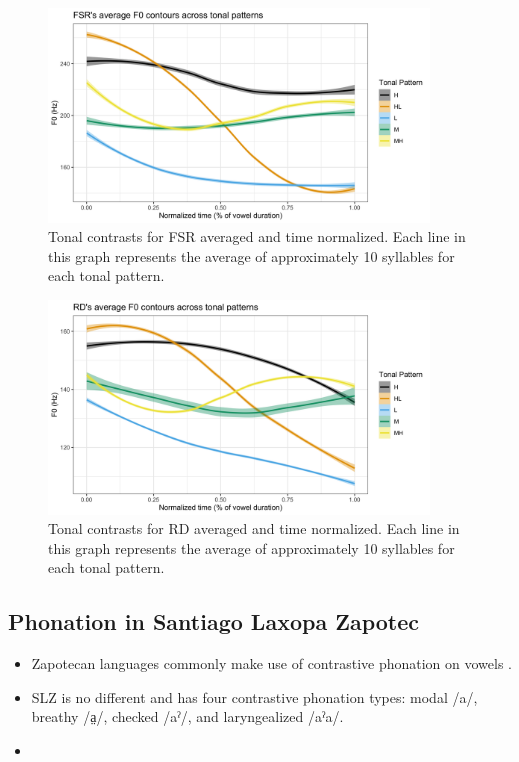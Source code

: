 \documentclass[12pt, letterpaper]{article}
\begin{document}
\begin{figure}[!ht]
	\centering
	\includegraphics[width=0.9\textwidth]{../FSRTonePlot.png}
	\caption{Tonal contrasts for FSR averaged and time normalized. Each line in this graph represents the average of approximately 10 syllables for each tonal pattern. }
	\label{fig:FSRTonePlot}
\end{figure}

\begin{figure}[!ht]
	\centering
	\includegraphics[width=0.9\textwidth]{../RDTonePlot.png}
	\caption{Tonal contrasts for RD averaged and time normalized. Each line in this graph represents the average of approximately 10 syllables for each tonal pattern.}
	\label{fig:RDTonePlot}
\end{figure}
\subsection{Phonation in Santiago Laxopa Zapotec} \label{sec:Phonation}

\begin{itemize}
	\item Zapotecan languages commonly make use of contrastive phonation on vowels \citep[e.g.,][]{avelinobecerraTopicsYalalagZapotec2004,longDiccionarioZapotecoSan2005,avelinoAcousticElectroglottographicAnalyses2010,lopeznicolasEstudiosFonologiaGramatica2016,chavez-peonInteractionMetricalStructure2010}.
	\item SLZ is no different and has four contrastive phonation types: modal /a/, breathy /a̤/, checked /aˀ/, and laryngealized /aˀa/. 
	\item 
\end{itemize}
\end{document}
